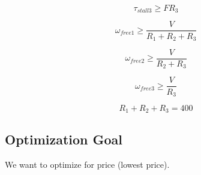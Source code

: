 \documentclass{article}
\begin{document}
\begin{equation}
    \tau_{stall 3} \geq F R_3
\end{equation}

\begin{equation}
    \omega_{free 1} \geq \frac{V}{R_1 + R_2 + R_3}
\end{equation}

\begin{equation}
    \omega_{free 2} \geq \frac{V}{R_2 + R_3}
\end{equation}

\begin{equation}
    \omega_{free 3} \geq \frac{V}{R_3}
\end{equation}

\begin{equation}
    R_1 + R_2 + R_3 = 400
\end{equation}

\FloatBarrier
\subsection{Optimization Goal}

We want to optimize for price (lowest price).
\end{document}
